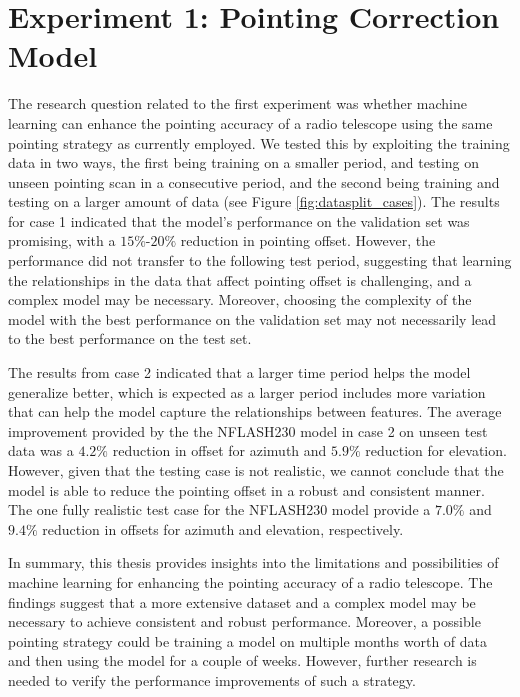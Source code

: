 \section{Experiment 1: Pointing Correction Model}
The research question related to the first experiment was whether machine learning can enhance the pointing accuracy of a radio telescope using the same pointing strategy as currently employed.
We tested this by exploiting the training data in two ways, the first being training on a smaller period, and testing on unseen pointing scan in a consecutive period,
and the second being training and testing on a larger amount of data (see Figure \ref{fig:datasplit_cases}).
The results for case 1 indicated that the model's performance on the validation set was promising, with a $15\%$-$20\%$ reduction in pointing offset.
However, the performance did not transfer to the following test period, suggesting that learning the relationships in the data that affect pointing offset is challenging, and a complex model may be necessary.
Moreover, choosing the complexity of the model with the best performance on the validation set may not necessarily lead to the best performance on the test set.

The results from case 2 indicated that a larger time period helps the model generalize better,
which is expected as a larger period includes more variation that can help the model capture the relationships between features.
The average improvement provided by the the NFLASH230 model in case 2 on unseen test data was a $4.2\%$ reduction in offset for azimuth and $5.9\%$ reduction for elevation.
However, given that the testing case is not realistic, we cannot conclude that the model is able to reduce the pointing offset in a robust and consistent manner.
The one fully realistic test case for the NFLASH230 model provide a $7.0\%$ and $9.4\%$ reduction in offsets for azimuth and elevation, respectively. 

In summary, this thesis provides insights into the limitations and possibilities of machine learning for enhancing the pointing accuracy of a radio telescope.
The findings suggest that a more extensive dataset and a complex model may be necessary to achieve consistent and robust performance.
Moreover, a possible pointing strategy could be training a model on multiple months worth of data and then using the model for a couple of weeks.
However, further research is needed to verify the performance improvements of such a strategy.

